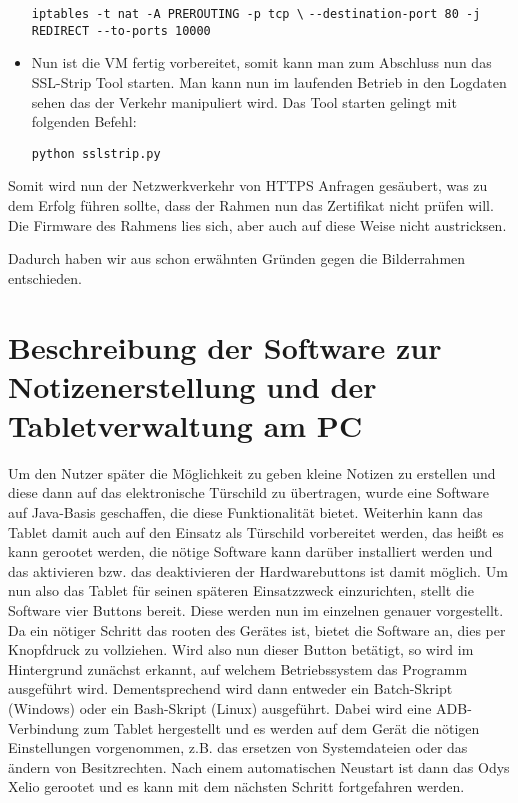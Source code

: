 \begin{flushleft}
\begin{itemize}
    \begin{center}
      \verb+iptables -t nat -A PREROUTING -p tcp \+
      \verb+--destination-port 80 -j REDIRECT --to-ports 10000+
    \end{center}
    \item Nun ist die VM fertig vorbereitet, somit kann man zum Abschluss nun das SSL-Strip Tool starten. Man kann nun im laufenden Betrieb in den Logdaten sehen das der Verkehr manipuliert wird. Das Tool starten gelingt mit folgenden Befehl:
    \begin{center}
      \verb+python sslstrip.py+
    \end{center}
    \end{itemize}
    Somit wird nun der Netzwerkverkehr von HTTPS Anfragen gesäubert, was zu dem Erfolg führen sollte, dass der Rahmen nun das Zertifikat nicht prüfen will. Die Firmware des Rahmens lies sich, aber auch auf diese Weise nicht austricksen.
    
    Dadurch haben wir aus schon erwähnten Gründen gegen die Bilderrahmen entschieden.

\section{Beschreibung der Software zur Notizenerstellung und der Tabletverwaltung am PC}
Um den Nutzer später die Möglichkeit zu geben kleine Notizen zu erstellen und diese dann auf das elektronische Türschild zu übertragen, wurde eine Software auf Java-Basis geschaffen, die diese Funktionalität bietet. Weiterhin kann das Tablet damit auch auf den Einsatz als Türschild vorbereitet werden, das heißt es kann gerootet werden, die nötige Software kann darüber installiert werden und das aktivieren bzw. das deaktivieren der Hardwarebuttons ist damit möglich. 
Um nun also das Tablet für seinen späteren Einsatzzweck einzurichten, stellt die Software vier Buttons bereit. Diese werden nun im einzelnen genauer vorgestellt. 
Da ein nötiger Schritt das rooten des Gerätes ist, bietet die Software an, dies per Knopfdruck zu vollziehen. Wird also nun dieser Button betätigt, so wird im Hintergrund zunächst erkannt, auf welchem Betriebssystem das Programm ausgeführt wird. Dementsprechend wird dann entweder ein Batch-Skript (Windows) oder ein Bash-Skript (Linux) ausgeführt. Dabei wird eine ADB-Verbindung zum Tablet hergestellt und es werden auf dem Gerät die nötigen Einstellungen vorgenommen, z.B. das ersetzen von Systemdateien oder das ändern von Besitzrechten. Nach einem automatischen Neustart ist dann das Odys Xelio gerootet und es kann mit dem nächsten Schritt fortgefahren werden.


\end{flushleft}
